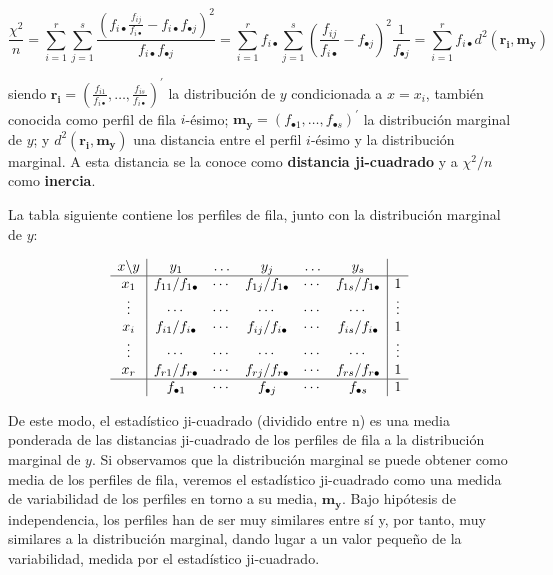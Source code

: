 \documentclass[
  a4paper,
  oneside]{scrbook}
\theoremstyle{definition}
\theoremstyle{definition}
\theoremstyle{definition}
\theoremstyle{definition}
\theoremstyle{remark}
\begin{document}
\[\frac{\chi^2}{n}=\sum_{i=1}^r\sum_{j=1}^s
\frac{\left(f_{i\bullet}\frac{f_{ij}}{f_{i\bullet}}
-f_{i\bullet}f_{\bullet j}\right)^2}{f_{i\bullet}f_{\bullet j}}
=\sum_{i=1}^r f_{i\bullet} \sum_{j=1}^s
\left(\frac{f_{ij}}{f_{i\bullet}}-f_{\bullet j}\right)^2
\frac{1}{f_{\bullet j}}=\sum_{i=1}^r f_{i\bullet} d^2(\bm{r_i},\bm{m_y})\]

siendo
\(\bm{r_i}=\left(\frac{f_{i1}}{f_{i\bullet}},\ldots,\frac{f_{is}}{f_{i\bullet}}\right)^\prime{}\)
la distribución de \(y\) condicionada a \(x=x_i\), también conocida como
perfil de fila \(i\)-ésimo;
\(\bm{m_y}=\left(f_{\bullet 1},\ldots,f_{\bullet s}\right)^\prime{}\) la
distribución marginal de \(y\); y \(d^2(\bm{r_i},\bm{m_y})\) una distancia
entre el perfil \(i\)-ésimo y la distribución marginal. A esta distancia
se la conoce como \textbf{distancia ji-cuadrado} y a \(\chi^2/n\) como
\textbf{inercia}.

La tabla siguiente contiene los perfiles de fila, junto con la
distribución marginal de \(y\):

\[\begin{array}{c|ccccc|c}
x\backslash y & y_1 & \ldots & y_j & \ldots & y_s & \\
\hline x_1 & f_{11}/f_{1\bullet} & \cdots & f_{1j}/f_{1\bullet} & \cdots & f_{1s}/f_{1\bullet} & 1 \\
\vdots & \cdots & \cdots & \cdots & \cdots & \cdots & \vdots \\
x_i & f_{i1}/f_{i\bullet} & \cdots & f_{ij}/f_{i\bullet} & \cdots & f_{is}/f_{i\bullet} & 1 \\
\vdots & \cdots & \cdots & \cdots & \cdots & \cdots & \vdots \\
x_r & f_{r1}/f_{r\bullet} & \cdots & f_{rj}/f_{r\bullet} & \cdots & f_{rs}/f_{r\bullet} & 1 \\
\hline & f_{\bullet 1} & \cdots & f_{\bullet j} & \cdots & f_{\bullet s} & 1 \\
\end{array}\]

De este modo, el estadístico ji-cuadrado (dividido entre n) es una media
ponderada de las distancias ji-cuadrado de los perfiles de fila a la
distribución marginal de \(y\). Si observamos que la distribución marginal
se puede obtener como media de los perfiles de fila, veremos el
estadístico ji-cuadrado como una medida de variabilidad de los perfiles
en torno a su media, \(\bm{m_y}\). Bajo hipótesis de independencia, los
perfiles han de ser muy similares entre sí y, por tanto, muy similares a
la distribución marginal, dando lugar a un valor pequeño de la
variabilidad, medida por el estadístico ji-cuadrado.
\end{document}
